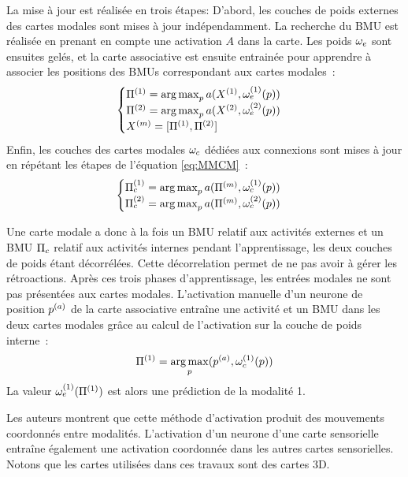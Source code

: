 \documentclass[../main]{subfiles}
\begin{document}
{La mise à jour est réalisée en trois étapes: 
D'abord, les couches de poids externes des cartes modales sont mises à jour indépendamment.
La recherche du BMU est réalisée en prenant en compte une activation $A$ dans la carte.
Les poids $\omega_e$ sont ensuites gelés, et la carte associative est ensuite entrainée pour apprendre à associer les positions des BMUs correspondant aux cartes modales~: 
\begin{equation}\label{eq:MMCM}
\begin{cases}
    \Pi^{({1})} = \operatorname*{arg\,max}_p a(X^{({1})}, \omega_e^{({1})}(p))\\
    \Pi^{({2})} = \operatorname*{arg\,max}_p a(X^{({2})}, \omega_e^{({2})}(p))\\
    X^{({m})} = [\Pi^{({1})}, \Pi^{({2})}]\\
\end{cases}
\end{equation}
Enfin, les couches des cartes modales $\omega_c$ dédiées aux connexions sont mises à jour en répétant les étapes de l'équation \ref{eq:MMCM}~:
\begin{equation}\label{eq:MMCM}
    \begin{cases}
        \Pi_c^{({1})} = \operatorname*{arg\,max}_p a(\Pi^{({m})}, \omega_c^{({1})}(p))\\
        \Pi_c^{({2})} = \operatorname*{arg\,max}_p a(\Pi^{({m})}, \omega_c^{({2})}(p))
    \end{cases}
    \end{equation}

Une carte modale a donc à la fois un BMU relatif aux activités externes et un BMU $\Pi_c$ relatif aux activités internes pendant l'apprentissage, les deux couches de poids étant décorrélées.
Cette décorrelation permet de ne pas avoir à gérer les rétroactions.
Après ces trois phases d'apprentissage, les entrées modales ne sont pas présentées aux cartes modales. L'activation manuelle d'un neurone de position $p^{({a})}$ de la carte associative entraîne une activité et un BMU dans les deux cartes modales grâce au calcul de l'activation sur la couche de poids interne~: 
$$ \Pi^{({1})} = \operatorname*{arg\,max}_p(p^{({a})},\omega_c^{({1})}(p))$$
La valeur $\omega_e^{({1})}(\Pi^{({1})})$ est alors une prédiction de la modalité 1.

Les auteurs montrent que cette méthode d'activation produit des mouvements coordonnés entre modalités.
L'activation d'un neurone d'une carte sensorielle entraîne également une activation coordonnée dans les autres cartes sensorielles. 
Notons que les cartes utilisées dans ces travaux sont des cartes 3D.

}
\end{document}
